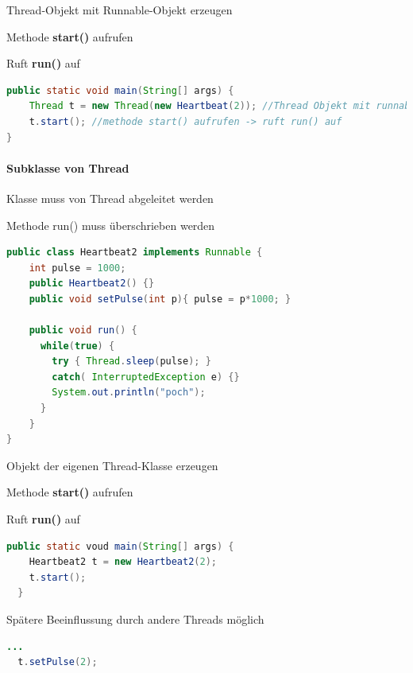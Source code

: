 \documentclass[10pt]{article}
\begin{document}
\begin{itemize*}
  \item Thread-Objekt mit Runnable-Objekt erzeugen
  \item Methode \textbf{start()} aufrufen
  \begin{itemize*}
    \item Ruft \textbf{run()} auf
  \end{itemize*}
\end{itemize*}
\begin{lstlisting}[language=java]
public static void main(String[] args) {
    Thread t = new Thread(new Heartbeat(2)); //Thread Objekt mit runnable erzeugen
    t.start(); //methode start() aufrufen -> ruft run() auf
}
\end{lstlisting}

\paragraph{Subklasse von Thread}

\begin{itemize*}
  \item Klasse muss von Thread abgeleitet werden
  \item Methode run() muss überschrieben werden
\end{itemize*}
\begin{lstlisting}[language=java]
public class Heartbeat2 implements Runnable {
    int pulse = 1000;
    public Heartbeat2() {}
    public void setPulse(int p){ pulse = p*1000; }

    public void run() {
      while(true) {
        try { Thread.sleep(pulse); }
        catch( InterruptedException e) {}
        System.out.println("poch");
      }
    }
}
\end{lstlisting}

\begin{itemize*}
  \item Objekt der eigenen Thread-Klasse erzeugen
  \item Methode \textbf{start()} aufrufen
  \begin{itemize*}
    \item Ruft \textbf{run()} auf
  \end{itemize*}
  \begin{lstlisting}[language=java]
  public static voud main(String[] args) {
    Heartbeat2 t = new Heartbeat2(2);
    t.start();
  }
  \end{lstlisting}
  \item Spätere Beeinflussung durch andere Threads möglich
  \begin{lstlisting}[language=java]
  ...
  t.setPulse(2);
  \end{lstlisting}
\end{itemize*}
\end{document}

